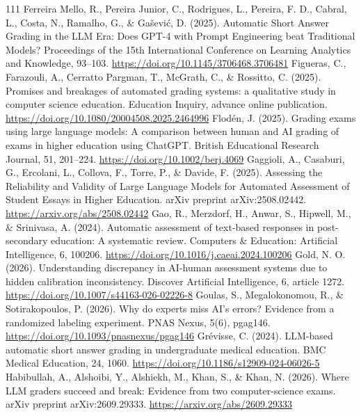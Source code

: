 \begin{thebibliography}{111}
 Ferreira Mello, R., Pereira Junior, C., Rodrigues, L., Pereira, F. D., Cabral, L., Costa, N., Ramalho, G., \& Ga\v{s}evi\'c, D. (2025). Automatic Short Answer Grading in the LLM Era: Does GPT-4 with Prompt Engineering beat Traditional Models? Proceedings of the 15th International Conference on Learning Analytics and Knowledge, 93--103. \url{https://doi.org/10.1145/3706468.3706481}
 Figueras, C., Farazouli, A., Cerratto Pargman, T., McGrath, C., \& Rossitto, C. (2025). Promises and breakages of automated grading systems: a qualitative study in computer science education. Education Inquiry, advance online publication. \url{https://doi.org/10.1080/20004508.2025.2464996}
 Flod\'{e}n, J. (2025). Grading exams using large language models: A comparison between human and AI grading of exams in higher education using ChatGPT. British Educational Research Journal, 51, 201--224. \url{https://doi.org/10.1002/berj.4069}
 Gaggioli, A., Casaburi, G., Ercolani, L., Collova, F., Torre, P., \& Davide, F. (2025). Assessing the Reliability and Validity of Large Language Models for Automated Assessment of Student Essays in Higher Education. arXiv preprint arXiv:2508.02442. \url{https://arxiv.org/abs/2508.02442}
 Gao, R., Merzdorf, H., Anwar, S., Hipwell, M., \& Srinivasa, A. (2024). Automatic assessment of text-based responses in post-secondary education: A systematic review. Computers \& Education: Artificial Intelligence, 6, 100206. \url{https://doi.org/10.1016/j.caeai.2024.100206}
 Gold, N. O. (2026). Understanding discrepancy in AI-human assessment systems due to hidden calibration inconsistency. Discover Artificial Intelligence, 6, article 1272. \url{https://doi.org/10.1007/s44163-026-02226-8}
 Goulas, S., Megalokonomou, R., \& Sotirakopoulos, P. (2026). Why do experts miss AI's errors? Evidence from a randomized labeling experiment. PNAS Nexus, 5(6), pgag146. \url{https://doi.org/10.1093/pnasnexus/pgag146}
 Gr\'evisse, C. (2024). LLM-based automatic short answer grading in undergraduate medical education. BMC Medical Education, 24, 1060. \url{https://doi.org/10.1186/s12909-024-06026-5}
 Habibullah, A., Alshoibi, Y., Alshiekh, M., Khan, S., \& Khan, N. (2026). Where LLM graders succeed and break: Evidence from two computer-science exams. arXiv preprint arXiv:2609.29333. \url{https://arxiv.org/abs/2609.29333}

\end{thebibliography}
